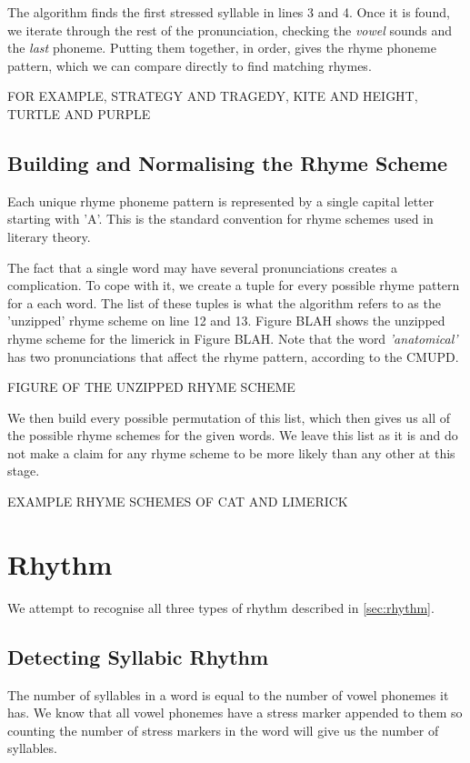 The algorithm finds the first stressed syllable in lines 3 and 4. Once it is found, we iterate through the rest of the pronunciation, checking the \textit{vowel} sounds and the \textit{last} phoneme. Putting them together, in order, gives the rhyme phoneme pattern, which we can compare directly to find matching rhymes. 

FOR EXAMPLE, STRATEGY AND TRAGEDY, KITE AND HEIGHT, TURTLE AND PURPLE		

\subsection{Building and Normalising the Rhyme Scheme}

Each unique rhyme phoneme pattern is represented by a single capital letter starting with 'A'. This is the standard convention for rhyme schemes used in literary theory. 

The fact that a single word may have several pronunciations creates a complication. To cope with it, we create a tuple for every possible rhyme pattern for a each word. The list of these tuples is what the algorithm refers to as the 'unzipped' rhyme scheme on line 12 and 13. Figure BLAH shows the unzipped rhyme scheme for the limerick in Figure BLAH. Note that the word \textit{'anatomical'} has two pronunciations that affect the rhyme pattern, according to the CMUPD.

FIGURE OF THE UNZIPPED RHYME SCHEME

We then build every possible permutation of this list, which then gives us all of the possible rhyme schemes for the given words. We leave this list as it is and do not make a claim for any rhyme scheme to be more likely than any other at this stage.

EXAMPLE RHYME SCHEMES OF CAT AND LIMERICK

\section{Rhythm}

We attempt to recognise all three types of rhythm described in \ref{sec:rhythm}. 

\subsection{Detecting Syllabic Rhythm}

The number of syllables in a word is equal to the number of vowel phonemes it has. We know that all vowel phonemes have a stress marker appended to them so counting the number of stress markers in the word will give us the number of syllables.

